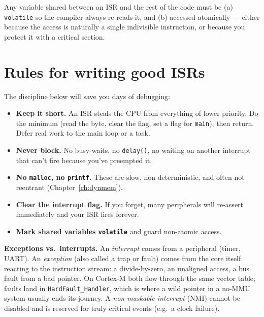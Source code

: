 \documentclass[11pt,a4paper,oneside]{book}
\newcommand{\code}[1]{\texttt{#1}}
\begin{document}
\begin{keyidea}
Any variable shared between an ISR and the rest of the code must be (a)
\code{volatile} so the compiler always re-reads it, and (b) accessed atomically
--- either because the access is naturally a single indivisible instruction, or
because you protect it with a critical section.
\end{keyidea}

\section{Rules for writing good ISRs}

The discipline below will save you days of debugging:
\begin{itemize}[leftmargin=1.4cm]
  \item \textbf{Keep it short.} An ISR steals the CPU from everything of lower
        priority. Do the minimum (read the byte, clear the flag, set a flag for
        \code{main}), then return. Defer real work to the main loop or a task.
  \item \textbf{Never block.} No busy-waits, no \code{delay()}, no waiting on
        another interrupt that can't fire because you've preempted it.
  \item \textbf{No \code{malloc}, no \code{printf}.} These are slow,
        non-deterministic, and often not reentrant (Chapter~\ref{ch:dynmem}).
  \item \textbf{Clear the interrupt flag.} If you forget, many peripherals will
        re-assert immediately and your ISR fires forever.
  \item \textbf{Mark shared variables \code{volatile}} and guard non-atomic
        access.
\end{itemize}

\begin{note}
\textbf{Exceptions vs.\ interrupts.} An \emph{interrupt} comes from a
peripheral (timer, UART). An \emph{exception} (also called a trap or fault)
comes from the core itself reacting to the instruction stream: a divide-by-zero,
an unaligned access, a bus fault from a bad pointer. On Cortex-M both flow
through the same vector table; faults land in \code{HardFault\_Handler}, which
is where a wild pointer in a no-MMU system usually ends its journey. A
\emph{non-maskable interrupt} (NMI) cannot be disabled and is reserved for
truly critical events (e.g.\ a clock failure).
\end{note}
\end{document}
